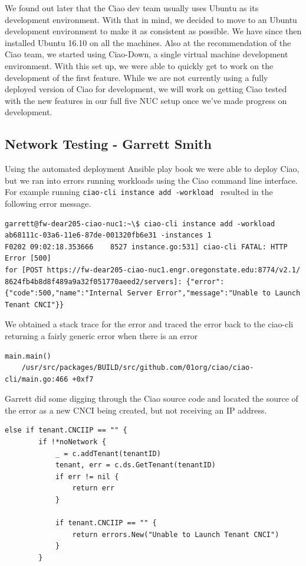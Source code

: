 \documentclass[10pt,onecolumn,journal,draftclsnofoot]{IEEEtran}
\begin{document}
We found out later that the Ciao dev team usually uses Ubuntu as its development
environment. With that in mind, we decided to move to an Ubuntu development
environment to make it as consistent as possible. We have since then installed
Ubuntu 16.10 on all the machines. Also at the recommendation of the Ciao team,
we started using Ciao-Down, a single virtual machine development environment.
With this set up, we were able to quickly get to work on the development of the
first feature. While we are not currently using a fully deployed version of Ciao
for development, we will work on getting Ciao tested with the new features in
our full five NUC setup once we've made progress on development.

\subsection{Network Testing - Garrett Smith}

Using the automated deployment Ansible play book we were able to deploy Ciao,
but we ran into errors running workloads using the Ciao command line interface.
For example running \texttt{ciao-cli instance add -workload } resulted in the
following error message.

\begin{lstlisting}[caption = Failing to run a workload]
garrett@fw-dear205-ciao-nuc1:~\$ ciao-cli instance add -workload ab68111c-03a6-11e6-87de-001320fb6e31 -instances 1
F0202 09:02:18.353666    8527 instance.go:531] ciao-cli FATAL: HTTP Error [500] 
for [POST https://fw-dear205-ciao-nuc1.engr.oregonstate.edu:8774/v2.1/
8624fb4b8d8f489a9a32f051770aeed2/servers]: {"error":{"code":500,"name":"Internal Server Error","message":"Unable to Launch Tenant CNCI"}}
\end{lstlisting}

We obtained a stack trace for the error and traced the error back to the
ciao-cli returning a fairly generic error when there is an error 
\begin{lstlisting}[caption = 500 error stack trace portion]
main.main()
    /usr/src/packages/BUILD/src/github.com/01org/ciao/ciao-cli/main.go:466 +0xf7
\end{lstlisting}

Garrett did some digging through the Ciao source code and located the source of
the error as a new CNCI being created, but not receiving an IP address.

\begin{lstlisting}[caption = Unable to launch tenant CNCI error location.]
else if tenant.CNCIIP == "" {
		if !*noNetwork {
			_ = c.addTenant(tenantID)
			tenant, err = c.ds.GetTenant(tenantID)
			if err != nil {
				return err
			}

			if tenant.CNCIIP == "" {
				return errors.New("Unable to Launch Tenant CNCI")
			}
		}
\end{lstlisting}
\end{document}
